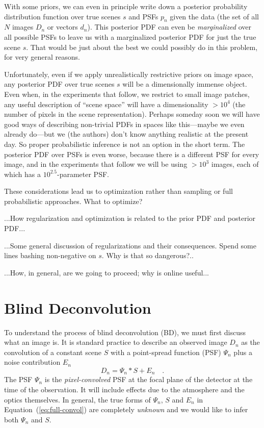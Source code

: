 \documentclass[12pt,preprint]{aastex}
\newcommand{\Eq}[1]{Equation~(\ref{eq:#1})}
\newcommand{\eq}[1]{\Eq{#1}}
\newcommand{\eqlabel}[1]{\label{eq:#1}}
\newcommand{\data}{\ensuremath{D}}
\begin{document}
With some priors, we can even in principle write down a posterior
probability distribution function over true scenes $s$ and PSFs $p_n$
given the data (the set of all $N$ images $\data_n$ or vectors $d_n$).
This posterior PDF can even be \emph{marginalized} over all possible
PSFs to leave us with a marginalized posterior PDF for just the true
scene $s$.  That would be just about the best we could possibly do in
this problem, for very general reasons.

Unfortunately, even if we apply unrealistically restrictive priors on
image space, any posterior PDF over true scenes $s$ will be a
dimensionally immense object.  Even when, in the experiments that
follow, we restrict to small image patches, any useful description of
``scene space'' will have a dimensionality $>10^4$ (the number of
pixels in the scene representation).  Perhaps someday soon we will
have good ways of describing non-trivial PDFs in spaces like
this---maybe we even already do---but we (the authors) don't know
anything realistic at the present day.  So proper probabilistic
inference is not an option in the short term.  The posterior PDF over
PSFs is even worse, because there is a different PSF for every image,
and in the experiments that follow we will be using $>10^3$ images,
each of which has a $10^{2.5}$-parameter PSF.

These considerations lead us to optimization rather than sampling or
full probabilistic approaches.  What to optimize?

...How regularization and optimization is related to the prior PDF and posterior PDF...

...Some general discussion of regularizations and their consequences.
Spend some lines bashing non-negative on $s$.  Why is that so
dangerous?..

...How, in general, are we going to proceed; why is online useful...

\section{Blind Deconvolution}

To understand the process of blind deconvolution (BD), we must first discuss
what an image is. It is standard practice to describe an observed image
$D_n$ as the convolution of a constant scene $S$ with a point-spread function
(PSF) $\Psi_n$ plus a noise contribution $E_n$
\begin{equation} \eqlabel{full-convol}
    D_n = \Psi_n \ast S + E_n \quad.
\end{equation}
The PSF $\Psi_n$ is the \emph{pixel-convolved} PSF at the focal plane of the
detector at the time of the observation. It will include effects due to
the atmosphere and the optics themselves. In general, the true forms of
$\Psi_n$, $S$ and $E_n$ in \eq{full-convol} are completely \emph{unknown}
and we would like to infer both $\Psi_n$ and $S$.
\end{document}
